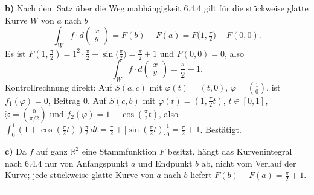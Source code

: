 \documentclass[a4paper,11pt]{article}
\begin{document}
\textbf{b)} Nach dem Satz über die Wegunabhängigkeit 6.4.4 gilt für die stückweise glatte Kurve $W$ von $a$ nach $b$
\[\int_W f\cdot d\!\begin{pmatrix}x\\y\end{pmatrix}=F(b)-F(a)=F\!\Big(1,\tfrac{\pi}{2}\Big)-F(0,0).\]
Es ist $F(1,\tfrac{\pi}{2})=1^{2}\cdot\tfrac{\pi}{2}+\sin\!\big(\tfrac{\pi}{2}\big)=\tfrac{\pi}{2}+1$ und $F(0,0)=0$, also
\[\int_W f\cdot d\!\begin{pmatrix}x\\y\end{pmatrix}=\frac{\pi}{2}+1.\]
Kontrollrechnung direkt: Auf $S(a,c)$ mit $\varphi(t)=(t,0)$, $\dot\varphi=\binom10$, ist $f_1(\varphi)=0$, Beitrag $0$. Auf $S(c,b)$ mit $\varphi(t)=(1,\tfrac{\pi}{2}t)$, $t\in[0,1]$, $\dot\varphi=\binom{0}{\pi/2}$ und $f_2(\varphi)=1+\cos(\tfrac{\pi}{2}t)$, also $\int_0^1(1+\cos(\tfrac{\pi}{2}t))\tfrac{\pi}{2}\,dt=\tfrac{\pi}{2}+\big[\sin(\tfrac{\pi}{2}t)\big]_0^1=\tfrac{\pi}{2}+1$. Bestätigt.

\textbf{c)} Da $f$ auf ganz $\mathbb{R}^2$ eine Stammfunktion $F$ besitzt, hängt das Kurvenintegral nach 6.4.4 nur von Anfangspunkt $a$ und Endpunkt $b$ ab, nicht vom Verlauf der Kurve; jede stückweise glatte Kurve von $a$ nach $b$ liefert $F(b)-F(a)=\tfrac{\pi}{2}+1$.\par\bigskip\hrule\bigskip
\end{document}
